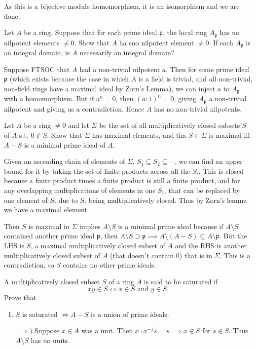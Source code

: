 \begin{questions}
\begin{solution}
	As this is a bijective module homomorphism, it is an isomorphism and we are done.
\end{solution}

\question Let $A $ be a ring. Suppose that for each prime ideal $\mathfrak{p} $, the local ring $A_{\mathfrak{p}} $ has no nilpotent elements $\ne 0 $. Show that $A $ ha sno nilpotent element $\ne 0 $. If each $A_{\mathfrak{p}} $ is an integral domain, is $A $ necessarily an integral domain?
\begin{solution}
	Suppose FTSOC that $A $ had a non-trivial nilpotent $a $.
	Then for some prime ideal $\mathfrak{p} $ (which exists because the case in which $A $ is a field is trivial, and all non-trivial, non-field rings have a maximal ideal by Zorn's Lemma), we can inject $a $ to $A_{\mathfrak{p}} $ with a homomorphism.
	But if $a^n = 0 $, then $(a:1)^n = 0 $, giving $A_{\mathfrak{p}} $ a non-trivial nilpotent and giving us a contradiction.
	Hence $A $ has no non-trivial nilpotents.
\end{solution}

\question Let $A $ be a ring $\ne 0 $ and let $\Sigma  $ be the set of all multiplicatively closed subsets $S $ of $A $ s.t. $0\not\in S $. Show that $\Sigma  $ has maximal elements, and tha $S \in \Sigma $ is maximal iff $A - S $ is a minimal prime ideal of $A $.
\begin{solution}
	Given an ascending chain of elements of $\Sigma $, $S_{1}\subseteq S_{2} \subseteq \cdots $, we can find an upper bound for it by taking the set of finite products across all the $S_i $.
	This is closed because a finite product times a finite product is still a finite product, and for any overlapping multiplications of elements in one $S_i $, that can be replaced by one element of $S_i $ due to $S_i $ being multiplicatively closed.
	Thus by Zorn's lemma we have a maximal element.

	Then $S $ is maximal in $\Sigma $ implies $A \setminus S $ is a minimal prime ideal because if $A \setminus S  $ contained another prime ideal $\mathfrak{p} $, then $A\setminus S \supset \mathfrak{p} \implies A \setminus (A-S) \subseteq A \setminus \mathfrak{p} $.
	But the LHS is $S $, a maximal multiplicatively closed subset of $A $ and the RHS is another multiplicatively closed subset of $A $ (that doesn't contain $0 $) that is in $\Sigma $.
	This is a contradiction, so $S $ contains no other prime ideals.
\end{solution}

\question A multiplicatively closed subset $S $ of a ring $A $ is said to be saturated if
\[
	xy \in S \iff x \in S \text{ and } y \in S
.\] 
Prove that
\begin{enumerate}
	\item $S $ is saturated $\iff A - S $ is a union of prime ideals.
	\begin{solution}
		$\implies) $ Suppose $x\in A$ was a unit.
		Then $x \cdot x^{-1}s = s \implies x \in S$ for $s\in S $.
		Thus $A\setminus S $ has no units.


\end{solution}
\end{enumerate}
\end{questions}
